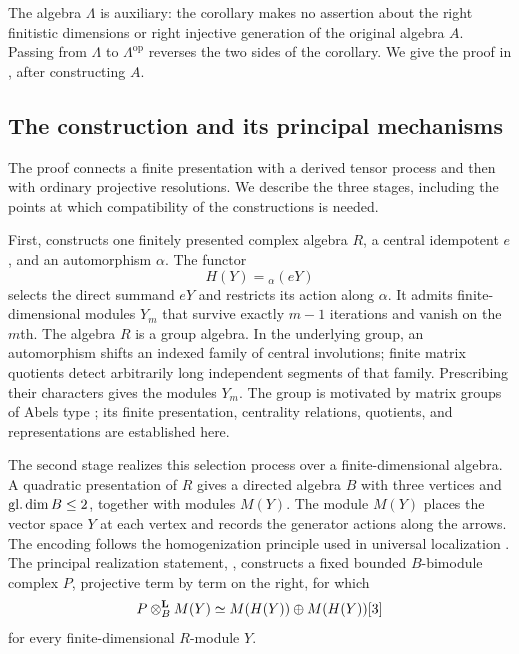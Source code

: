 The algebra \(\Lambda\) is auxiliary: the corollary makes no assertion
about the right finitistic dimensions or right injective generation of
the original algebra \(A\). Passing from \(\Lambda\) to
\(\Lambda^{\mathrm{op}}\) reverses the two sides of the corollary.
We give the proof in , after constructing
\(A\).

\subsection{The construction and its principal mechanisms}

The proof connects a finite presentation with a derived tensor
process and then with ordinary projective resolutions.
We describe the three stages, including the points at which
compatibility of the constructions is needed.

First,  constructs one finitely presented
complex algebra \(R\), a central idempotent \(e\), and an automorphism
\(\alpha\).  The functor
\[
H(Y)={}_{\alpha}(eY)
\]
selects the direct summand \(eY\) and restricts its action along
\(\alpha\).  It admits finite-dimensional modules \(Y_m\) that
survive exactly \(m-1\) iterations and vanish on the \(m\)th.
The algebra \(R\) is a group algebra.  In the underlying group,
an automorphism shifts an indexed family of central involutions;
finite matrix quotients detect arbitrarily long independent
segments of that family.  Prescribing their characters gives the
modules \(Y_m\).  The group is motivated by matrix groups of
Abels type \cite{Rego2022}; its finite presentation, centrality
relations, quotients, and representations are established here.

The second stage realizes this selection process over a
finite-dimensional algebra.  A quadratic presentation of \(R\)
gives a directed algebra \(B\) with three vertices and
\(\operatorname{gl.dim} B\le2\), together with modules \(M(Y)\).
The module \(M(Y)\) places the vector space \(Y\) at each vertex and
records the generator actions along the arrows.
The encoding follows the homogenization principle used in
universal localization \cite{NRS2004}.
The principal realization statement, ,
constructs a fixed bounded \(B\)-bimodule complex \(P\), projective
term by term on the right, for which
\[
P\otimes^{\mathbf L}_B M(Y)\simeq M(H(Y))\oplus M(H(Y))[3]
\]
for every finite-dimensional \(R\)-module \(Y\).

